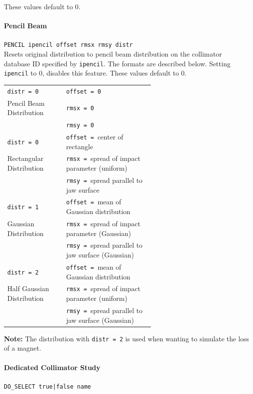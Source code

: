 These values default to 0.

\paragraph{Pencil Beam} \texttt{PENCIL ipencil offset rmsx rmsy distr}\\

Resets original distribution to pencil beam distribution on the collimator database ID specified by \texttt{ipencil}.
The formats are described below.
Setting \texttt{ipencil} to 0, disables this feature.
These values default to 0.

\bigskip
\begin{tabular}{@{}l|p{0.6\linewidth}}
    \texttt{distr = 0}         & \texttt{offset = 0} \\
    Pencil Beam Distribution   & \texttt{rmsx   = 0} \\
                               & \texttt{rmsy   = 0} \\
    \hline
    \texttt{distr = 0}         & \texttt{offset = }center of rectangle \\
    Rectangular Distribution   & \texttt{rmsx   = }spread of impact parameter (uniform) \\
                               & \texttt{rmsy   = }spread parallel to jaw surface \\
    \hline
    \texttt{distr = 1}         & \texttt{offset = }mean of Gaussian distribution \\
    Gaussian Distribution      & \texttt{rmsx   = }spread of impact parameter (Gaussian) \\
                               & \texttt{rmsy   = }spread parallel to jaw surface (Gaussian) \\
    \hline
    \texttt{distr = 2}         & \texttt{offset = }mean of Gaussian distribution \\
    Half Gaussian Distribution & \texttt{rmsx   = }spread of impact parameter (uniform) \\
                               & \texttt{rmsy   = }spread parallel to jaw surface (Gaussian) \\
\end{tabular}

\bigskip
\noindent\textbf{Note:} The distribution with \texttt{distr = 2} is used when wanting to simulate the loss of a magnet.

\paragraph{Dedicated Collimator Study} \texttt{DO\_SELECT true|false name}\\

